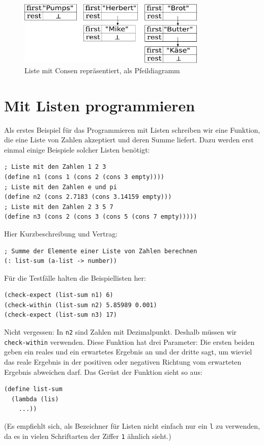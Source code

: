 \begin{figure}[tb]
  \centering
  \includegraphics[width=0.8\textwidth]{pair-lists2}
  \caption{Liste mit Consen repräsentiert, als Pfeildiagramm}
  \label{fig:cons-lists-2}
\end{figure}


\section{Mit Listen programmieren}

Als erstes Beispiel für das Programmieren mit Listen schreiben wir
eine Funktion, die eine Liste von Zahlen akzeptiert und deren Summe
liefert.  Dazu werden erst einmal einige Beispiele solcher Listen
benötigt:
%
\begin{verbatim}
; Liste mit den Zahlen 1 2 3
(define n1 (cons 1 (cons 2 (cons 3 empty))))
; Liste mit den Zahlen e und pi
(define n2 (cons 2.7183 (cons 3.14159 empty)))
; Liste mit den Zahlen 2 3 5 7
(define n3 (cons 2 (cons 3 (cons 5 (cons 7 empty)))))
\end{verbatim}

Hier Kurzbeschreibung und Vertrag:\label{sec:list-sum}
%
\begin{verbatim}
; Summe der Elemente einer Liste von Zahlen berechnen
(: list-sum (a-list -> number))
\end{verbatim}
%
Für die Testfälle halten die Beispiellisten her:
%
\begin{verbatim}
(check-expect (list-sum n1) 6)
(check-within (list-sum n2) 5.85989 0.001)
(check-expect (list-sum n3) 17)
\end{verbatim}
%
Nicht vergessen: In \texttt{n2} sind Zahlen mit Dezimalpunkt.
Deshalb müssen wir \texttt{check-within} verwenden.  Diese Funktion
hat drei Parameter: Die ersten beiden geben ein reales und ein
erwartetes Ergebnis an
und der dritte sagt, um wieviel das reale Ergebnis in der positiven
oder negativen Richtung vom erwarteten Ergebnis abweichen darf. Das Gerüst der
Funktion sieht so aus:
%
\begin{verbatim}
(define list-sum
  (lambda (lis)
    ...))
\end{verbatim}
%
(Es empfiehlt sich, als Bezeichner für Listen nicht einfach nur ein
\texttt{l} zu verwenden, da es in vielen Schriftarten der Ziffer
\texttt{1} ähnlich sieht.)

